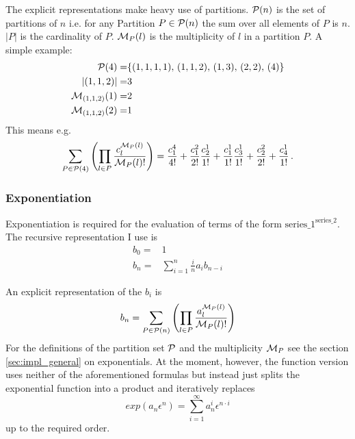 \documentclass{article}
\begin{document}
The explicit representations make heavy use of partitions.
${\cal P}(n)$ is the set of partitions of $n$ i.e. for any
Partition $P \in {\cal P}(n)$ the sum over all elements of $P$ is
$n$. $|P|$ is the cardinality of $P$.
${\cal M}_P(l)$ is the multiplicity of $l$ in a partition $P$. A simple
example:
\begin{align*}
  {\cal P}(4)=&\{(1,1,1,1),\,(1,1,2),\,(1,3),\,(2,2),\,(4)\}\\
  |(1,1,2)|=&3\\
  {\cal M}_{(1,1,2)}(1)=&2\\
  {\cal M}_{(1,1,2)}(2)=&1\\
\end{align*}
This means e.g. 
\begin{equation}
  \label{eq:exp_ex}
\sum_{P \in {\cal P}(4)} \left(\prod_{l \in P} \frac{c^{{\cal M}_P(l)}_l}{{\cal M}_P(l)!} \right)=
  \frac{c_1^4}{4!}+\frac{c_1^2}{2!}\frac{c_2^1}{1!}+\frac{c_1^1}{1!}\frac{c_3^1}{1!}+\frac{c_2^2}{2!}+\frac{c_4^1}{1!}\,.
\end{equation}


\subsubsection{Exponentiation}
\label{sec:impl_exp}

Exponentiation is required for the evaluation of terms of the form
$\text{series\_1}^{\text{series\_2}}$.
The recursive representation I use is
\begin{align}
  \label{eq:exp_rec}
b_0=&1\\
b_n =&  \sum_{i=1}^{n} \frac{i}{n} a_{i}b_{n-i}
\end{align}

An explicit representation of the $b_i$ is
\begin{equation}
  \label{eq:exp}
  \begin{split}
    b_n=
\sum_{P \in {\cal P}(n)} \left(\prod_{l \in P} \frac{a^{{\cal M}_P(l)}_l}{{\cal M}_P(l)!} \right)
  \end{split}
\end{equation}
For the definitions of the partition set ${\cal P}$ and the
multiplicity ${\cal M}_P$ see the section \ref{sec:impl_general} on
exponentials.
 At the moment, however, the function version uses neither of the
 aforementioned formulas but instead just splits the
 exponential function into a product and iteratively replaces
 \begin{equation}
   \label{eq:exp_simple}
   exp(a_n \epsilon^n)=\sum_{i=1}^\infty a_n^i \epsilon^{n\cdot i}
 \end{equation}
up to the required order.
\end{document}
